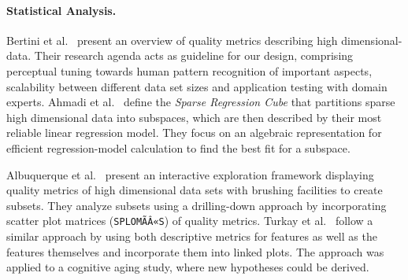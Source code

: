 \documentclass[journal]{style/vgtc} 			          %
\begin{document}
\paragraph{Statistical Analysis.}
Bertini et al.~\cite{Bertini} present an overview of quality metrics describing high dimensional-data.
Their research agenda acts as guideline for our design, comprising perceptual tuning towards human pattern recognition of important aspects, scalability between different data set sizes and application testing with domain experts.
Ahmadi et al.~\cite{Ahmadi} define the \emph{Sparse Regression Cube} that partitions sparse high dimensional data into subspaces, which are then described by their most reliable linear regression model.
They focus on an algebraic representation for efficient regression-model calculation to find the best fit for a subspace.

Albuquerque et al.~\cite{Albuquerque} present an interactive exploration framework displaying quality metrics of high dimensional data sets with brushing facilities to create subsets.
They analyze subsets using a drilling-down approach by incorporating scatter plot matrices (\texttt{SPLOMÃÂ«S}) of quality metrics. %
Turkay et al.~\cite{Turkay} follow a similar approach by using both descriptive metrics for features as well as the features themselves and incorporate them into linked plots.
The approach was applied to a cognitive aging study, where new hypotheses could be derived.
\end{document}
